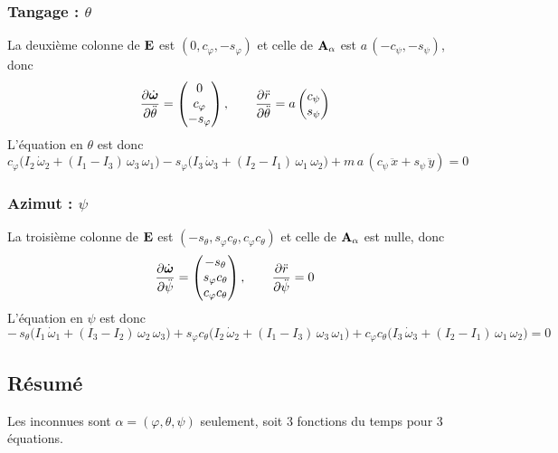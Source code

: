 \subsubsection{Tangage : \texorpdfstring{$\theta$}{theta}}

La deuxième colonne de $\mathbf{E}$ est $(0, c_\varphi, -s_\varphi)$ et
celle de $\mathbf{A}_\alpha$ est $a\,(-c_\psi, -s_\psi)$, donc
\[
    \frac{\partial \dot{\bm{\omega}}}{\partial \ddot\theta} = \begin{pmatrix}
        0\\ c_\varphi\\ -s_\varphi
    \end{pmatrix},
    \qquad
    \frac{\partial \ddot r}{\partial \ddot\theta} = a\begin{pmatrix}
        c_\psi\\ s_\psi
    \end{pmatrix}
\]
L'équation en $\theta$ est donc
\[
    c_\varphi\bigl(I_2\,\dot\omega_2 + (I_1 - I_3)\,\omega_3\,\omega_1
    \bigr)
    - s_\varphi\bigl(I_3\,\dot\omega_3 + (I_2 - I_1)\,\omega_1\,
    \omega_2\bigr)
    + m\,a\,(c_\psi\,\ddot x + s_\psi\,\ddot y) = 0
\]

\subsubsection{Azimut : \texorpdfstring{$\psi$}{psi}}

La troisième colonne de $\mathbf{E}$ est $(-s_\theta, s_\varphi c_\theta,
c_\varphi c_\theta)$ et celle de $\mathbf{A}_\alpha$ est nulle, donc
\[
    \frac{\partial \dot{\bm{\omega}}}{\partial \ddot\psi} = \begin{pmatrix}
        -s_\theta\\ s_\varphi c_\theta\\ c_\varphi c_\theta
    \end{pmatrix},
    \qquad
    \frac{\partial \ddot r}{\partial \ddot\psi} = 0
\]
L'équation en $\psi$ est donc
\[
    -\,s_\theta\bigl(I_1\,\dot\omega_1 + (I_3 - I_2)\,\omega_2\,
    \omega_3\bigr)
    + s_\varphi c_\theta\bigl(I_2\,\dot\omega_2 + (I_1 - I_3)\,
    \omega_3\,\omega_1\bigr)
    + c_\varphi c_\theta\bigl(I_3\,\dot\omega_3 + (I_2 - I_1)\,
    \omega_1\,\omega_2\bigr) = 0
\]

\subsection{Résumé}

Les inconnues sont $\alpha = (\varphi,\theta,\psi)$ seulement, soit
$3$ fonctions du temps pour $3$ équations.

